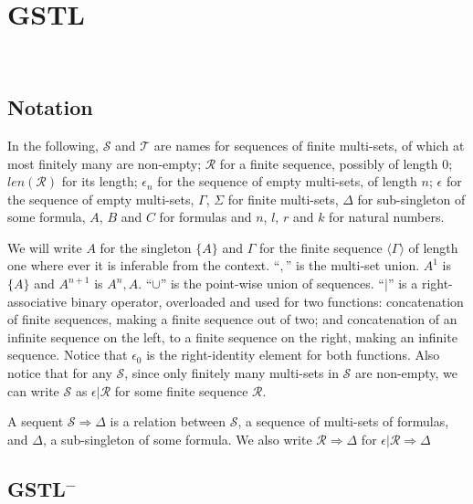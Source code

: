 \section{GSTL}‌\\

\subsection{Notation} In the following, $\mathcal{S}$ and $\mathcal{T}$ are names for sequences of finite multi-sets, of which at most finitely many are non-empty; $\mathcal{R}$ for a finite sequence, possibly of length $0$; $len(\mathcal{R})$ for its length; $\epsilon_n$ for the sequence of empty multi-sets, of length $n$; $\epsilon$ for the sequence of empty multi-sets, $\Gamma$, $\Sigma$ for finite multi-sets, $\Delta$ for sub-singleton of some formula, $A$, $B$ and $C$ for formulas and $n$, $l$, $r$ and $k$ for natural numbers.

We will write $A$ for the singleton $\{A\}$ and $\Gamma$ for the finite sequence $\langle\Gamma\rangle$ of length one where ever it is inferable from the context.
``$,$'' is the multi-set union.
$A^1$ is $\{A\}$ and $A^{n+1}$ is $A^n, A$.
``$\cup$'' is the point-wise union of sequences.
``$|$'' is a right-associative binary operator, overloaded and used for two functions: concatenation of finite sequences, making a finite sequence out of two; and concatenation of an infinite sequence on the left, to a finite sequence on the right, making an infinite sequence. Notice that $\epsilon_0$ is the right-identity element for both functions. Also notice that for any $\mathcal{S}$, since only finitely many multi-sets in $\mathcal{S}$ are non-empty, we can write $\mathcal{S}$ as $\epsilon | \mathcal{R}$ for some finite sequence $\mathcal{R}$.

A sequent $\mathcal{S} \Rightarrow \Delta$ is a relation between $\mathcal{S}$, a sequence of multi-sets of formulas, and $\Delta$, a sub-singleton of some formula. We also write $\mathcal{R} \Rightarrow \Delta$ for $\epsilon | \mathcal{R} \Rightarrow \Delta$

\subsection{GSTL$^-$}

